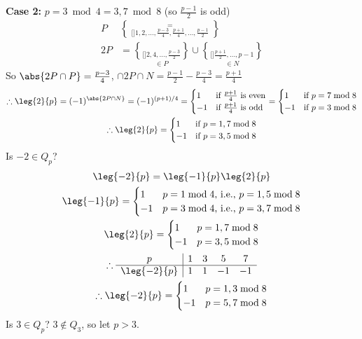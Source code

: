 \textbf{Case 2:}
$p=3\bmod4=3,7\bmod8$ (so $\frac{p-1}{2}$ is odd)
\begin{align*}
P &= \brace[\Big]{1,2,\dotsc,\frac{p-3}{4},\frac{p+1}{4},\dotsc,\frac{p-1}{2}} \\
2P &= \underset{\in P}{\brace[\Big]{2,4,\dotsc,\frac{p-3}{2}}}\cup\underset{\in N}{\brace[\Big]{\frac{p+1}{2},\dotsc,p-1}}
\end{align*}
So $\abs{2P\cap P}=\frac{p-3}{4}$, $\cap{2P\cap N}=\frac{p-1}{2}-\frac{p-3}{4}=\frac{p+1}{4}$
\begin{gather*}
\therefore \leg{2}{p} = (-1)^{\abs{2P\cap N}} = (-1)^{(p+1)/4} = \begin{cases}
1 & \text{if $\frac{p+1}{4}$ is even} \\
-1 & \text{if $\frac{p+1}{4}$ is odd}
\end{cases} = \begin{cases}
1 & \text{if $p=7\bmod8$} \\
-1 & \text{if $p=3\bmod8$}
\end{cases} \\
\therefore \leg{2}{p} = \begin{cases}
1 & \text{if $p=1,7\bmod8$} \\
-1 & \text{if $p=3,5\bmod8$}
\end{cases}
\end{gather*}
Is $-2\in Q_p$?
\begin{gather*}
\leg{-2}{p} = \leg{-1}{p}\leg{2}{p} \\
\leg{-1}{p} = \begin{cases}
1 & p=1\bmod4\text{, i.e., }p=1,5\bmod8 \\
-1 & p=3\bmod4\text{, i.e., }p=3,7\bmod8
\end{cases} \\
\leg{2}{p} = \begin{cases}
1 & p=1,7\bmod8 \\
-1 & p=3,5\bmod8
\end{cases} \\
\therefore \begin{array}{c|cccc}
p & 1 & 3 & 5 & 7 \\ \hline
\leg{-2}{p} & 1 & 1 & -1 & -1
\end{array} \\
\therefore \leg{-2}{p} = \begin{cases}
1 & p=1,3\bmod8 \\
-1 & p=5,7\bmod8
\end{cases}
\end{gather*}
Is $3\in Q_p$? $3\notin Q_3$, so let $p>3$.
